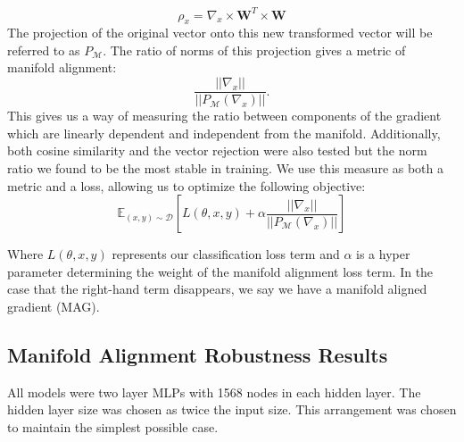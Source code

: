 \begin{equation}
    \rho_x = \nabla_x \times \textbf{W}^T \times \textbf{W}    
\end{equation}
The projection of the original vector onto this new transformed vector
will be referred to as $P_{\mathcal{M}}$.
The ratio of norms of this projection gives a metric of manifold alignment:
\begin{equation}
    \frac{|| \nabla_x || }{||P_{\mathcal{M}}(\nabla_x )||}.
  \label{equ:ratio}
\end{equation}
This gives us a way of measuring the ratio between components of the gradient which are linearly dependent and independent from the manifold.
Additionally, both cosine similarity and the vector rejection were also tested but the norm ratio we found to be the most stable in training.
We use this measure as both a metric and a loss, allowing us to optimize the following objective:
\begin{equation}
  \mathds{E}_{(x,y) \sim \mathcal{D}} \left[ L(\theta, x,y)  + \alpha \frac{|| \nabla_x || }{||P_{\mathcal{M}}(\nabla_x )||} \right]
  \label{equ:loss}
\end{equation}

Where $L(\theta, x, y)$ represents our classification loss term and $\alpha$ is a hyper parameter determining the weight of the manifold alignment loss term. In the case that the right-hand term disappears, we say we have a manifold aligned gradient (MAG). 

\subsection{Manifold Alignment Robustness Results}

All models were two layer MLPs with 1568 nodes in each hidden layer.
The hidden layer size was chosen as twice the input size.
This arrangement was chosen to maintain the simplest possible case.

